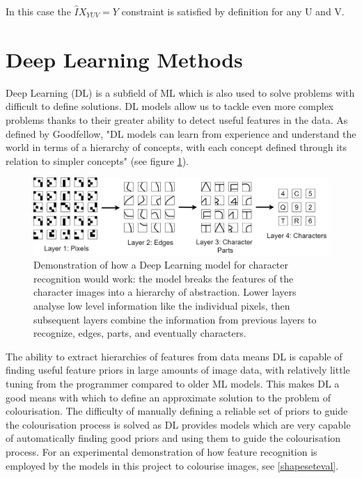 \documentclass{l4proj}
\begin{document}
In this case the $\hat{I} X_{YUV} = Y$ constraint is satisfied by definition for any U and V.

\section{Deep Learning Methods}
\label{deeplearning}
Deep Learning (DL) is a subfield of ML which is also used to solve problems with difficult to define solutions. DL models allow us to tackle even more complex problems thanks to their greater ability to detect useful features in the data. As defined by Goodfellow, "DL models can learn from experience and understand the world in terms of a hierarchy of concepts, with each concept defined through its relation to simpler concepts"\cite{Goodfellow} (see figure \ref{fig:deeplearning}).
\begin{figure}[h]
    \centering
    \includegraphics[width=1.0\linewidth]{images/DeepLearning.png}    

    \caption{Demonstration of how a Deep Learning model for character recognition would work: the model breaks the features of the character images into a hierarchy of abstraction. Lower layers analyse low level information like the individual pixels, then subsequent layers combine the information from previous layers to recognize, edges, parts, and eventually characters.}

    \label{fig:deeplearning} 
\end{figure}

The ability to extract hierarchies of features from data means DL is capable of finding useful feature priors in large amounts of image data, with relatively little tuning from the programmer compared to older ML models. This makes DL a good means with which to define an approximate solution to the problem of colourisation. The difficulty of manually defining a reliable set of priors to guide the colourisation process is solved as DL provides models which are very capable of automatically finding good priors and using them to guide the colourisation process. For an experimental demonstration of how feature recognition is employed by the models in this project to colourise images, see \ref{shapeseteval}.
\end{document}
